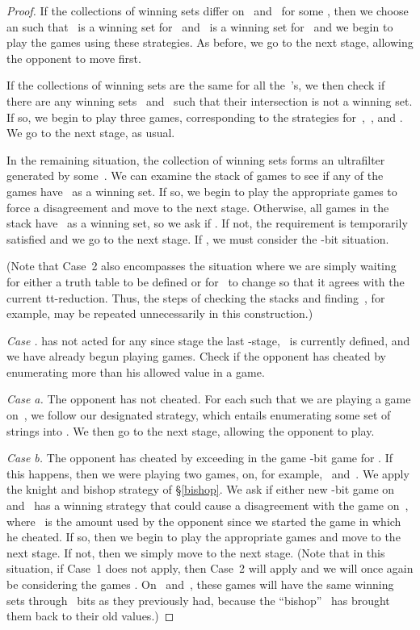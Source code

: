 \documentclass{LMCS}
\newcommand{\0}{\mathbf{0}}
\newcommand{\<}{\langle}
\renewcommand{\>}{\rangle}
\begin{document}
\begin{proof}
If the collections of winning sets differ on~ and~ for some
\mbox{}, then we choose an  such that~ is a
winning set for~ and~ is a winning set for~ and we
begin to play the games using these strategies. As before, we go to the next
stage, allowing the opponent to move first.

If the collections of winning sets are the same for all the~'s, we then
check if there are any winning sets~ and~ such that their intersection
is not a winning set.  If so, we begin to play three games, corresponding to
the strategies for~,~, and .  We go to the next
stage, as usual.

In the remaining situation, the collection of winning sets forms an
ultrafilter generated by some~.
We can examine the stack of games to see if any of the 
games have~ as a winning set.  If so, we begin to play
the appropriate games to force a disagreement and move to the next stage.
Otherwise, all games in the stack have~ as a winning set, so we
ask if .  If not, the requirement is temporarily satisfied
and we go to the next stage.  If , we must consider the
-bit situation.

(Note that Case~2 also encompasses the situation where we are simply waiting
for either a truth table to be defined or for~ to change so that it
agrees with the current tt-reduction.  Thus, the steps of checking the stacks
and finding~, for example, may be repeated unnecessarily in this
construction.)

\medskip
{\em Case .}  has not acted for any  since stage the
last -stage,~ is currently defined, and we have already begun
playing games.
Check if the opponent has cheated by enumerating more than his allowed value
in a game.

\smallskip
{\em Case a.} The opponent has not cheated. For each  such that we
are playing a game on~, we follow our designated strategy, which entails
enumerating some set of strings into .  We then go to the next
stage, allowing the opponent to play.



\smallskip
{\em Case b.} The opponent has cheated by exceeding  in
the game -bit game  for .  If this happens,
then we were playing two games, on, for example,~ and~.  We apply
the knight and bishop strategy of \S\ref{bishop}.  We ask if either new
-bit game  on~ and~ has a winning
strategy that could cause a disagreement with the game
 on~, where~ is the amount
used by the opponent since we started the game in which he cheated.  If so,
then we begin to play the appropriate games and move to the next stage.  If
not, then we simply move to the next stage.  (Note that in this situation, if
Case~1 does not apply, then Case~2 will apply and we will once again be
considering the games .  On~ and~, these
games will have the same winning sets through~ bits as they previously
had, because the ``bishop''~ has brought them back to their old values.)


\end{proof}
\end{document}
